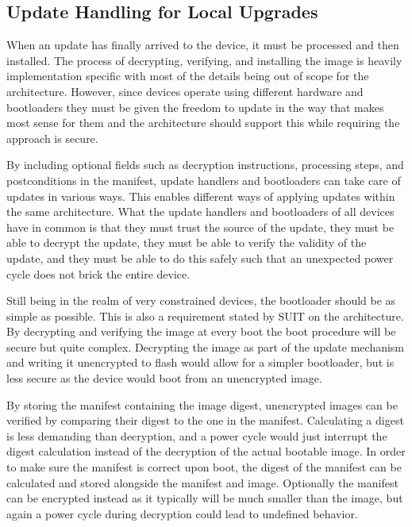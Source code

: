 \documentclass[0-thesis.tex]{subfiles}
\begin{document}
\subsection{Update Handling for Local Upgrades}
\label{ssec:upgrading}
When an update has finally arrived to the device, it must be processed and then installed.
The process of decrypting, verifying, and installing the image is heavily implementation
specific with most of the details being out of scope for the architecture. However, since
devices operate using different hardware and bootloaders they must be given the freedom to
update in the way that makes most sense for them and the architecture should support this
while requiring the approach is secure.

By including optional fields such as decryption instructions, processing steps, and
postconditions in the manifest, update handlers and bootloaders can take care of updates
in various ways. This enables different ways of applying updates within the same
architecture. What the update handlers and bootloaders of all devices have in common is
that they must trust the source of the update, they must be able to decrypt the update,
they must be able to verify the validity of the update, and they must be able to do this
safely such that an unexpected power cycle does not brick the entire device.

Still being in the realm of very constrained devices, the bootloader should be as simple
as possible. This is also a requirement stated by SUIT on the architecture. By decrypting
and verifying the image at every boot the boot procedure will be secure but quite complex.
Decrypting the image as part of the update mechanism and writing it unencrypted to flash
would allow for a simpler bootloader, but is less secure as the device would boot from an
unencrypted image.

By storing the manifest containing the image digest, unencrypted images can be verified by
comparing their digest to the one in the manifest. Calculating a digest is less demanding
than decryption, and a power cycle would just interrupt the digest calculation instead of
the decryption of the actual bootable image. In order to make sure the manifest is correct
upon boot, the digest of the manifest can be calculated and stored alongside the manifest
and image. Optionally the manifest can be encrypted instead as it typically will be much
smaller than the image, but again a power cycle during decryption could lead to undefined
behavior.
\end{document}
